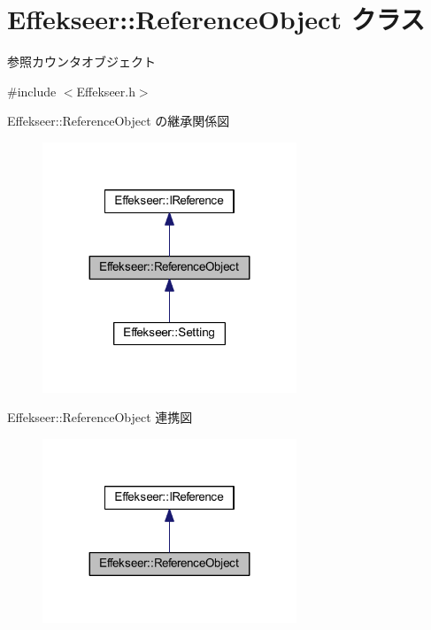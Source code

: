 \hypertarget{class_effekseer_1_1_reference_object}{}\section{Effekseer\+:\+:Reference\+Object クラス}
\label{class_effekseer_1_1_reference_object}


参照カウンタオブジェクト  




{\ttfamily \#include $<$Effekseer.\+h$>$}



Effekseer\+:\+:Reference\+Object の継承関係図\nopagebreak
\begin{figure}[H]
\begin{center}
\leavevmode
\includegraphics[width=215pt]{class_effekseer_1_1_reference_object__inherit__graph}
\end{center}
\end{figure}


Effekseer\+:\+:Reference\+Object 連携図\nopagebreak
\begin{figure}[H]
\begin{center}
\leavevmode
\includegraphics[width=215pt]{class_effekseer_1_1_reference_object__coll__graph}
\end{center}
\end{figure}

